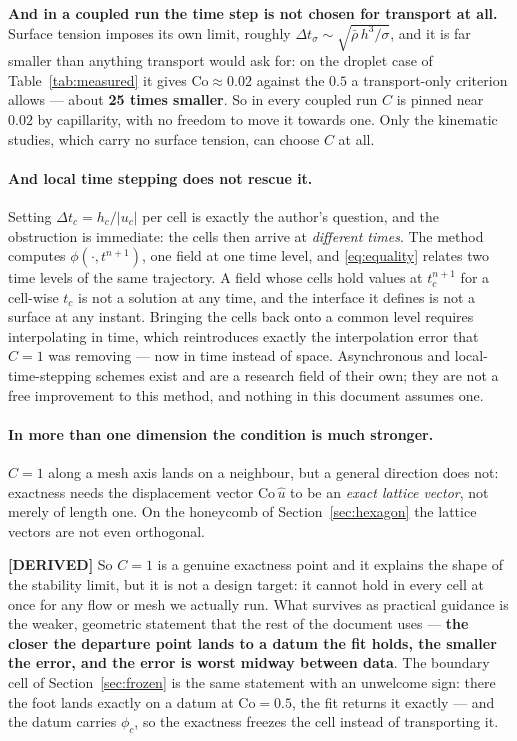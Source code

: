 \documentclass[11pt,a4paper]{article}
\newcommand{\derived}{\textcolor{blue!50!black}{\textbf{[DERIVED]}}}
\begin{document}
\textbf{And in a coupled run the time step is not chosen for transport at all.} Surface tension
imposes its own limit, roughly $\Delta t_\sigma \sim \sqrt{\bar\rho\,h^{3}/\sigma}$, and it is
far smaller than anything transport would ask for: on the droplet case of
Table~\ref{tab:measured} it gives $\mathrm{Co} \approx 0.02$ against the $0.5$ a transport-only
criterion allows --- about \textbf{25 times smaller}. So in every coupled run $C$ is pinned near
$0.02$ by capillarity, with no freedom to move it towards one. Only the kinematic studies, which
carry no surface tension, can choose $C$ at all.

\paragraph{And local time stepping does not rescue it.} Setting
$\Delta t_c = h_c/|u_c|$ per cell is exactly the author's question, and the obstruction is
immediate: the cells then arrive at \emph{different times}. The method computes
$\phi(\cdot,t^{n+1})$, one field at one time level, and \eqref{eq:equality} relates two time
levels of the same trajectory. A field whose cells hold values at $t_c^{n+1}$ for a cell-wise
$t_c$ is not a solution at any time, and the interface it defines is not a surface at any
instant. Bringing the cells back onto a common level requires interpolating in time, which
reintroduces exactly the interpolation error that $C = 1$ was removing --- now in time instead
of space. Asynchronous and local-time-stepping schemes exist and are a research field of their
own; they are not a free improvement to this method, and nothing in this document assumes one.

\paragraph{In more than one dimension the condition is much stronger.} $C = 1$ along a mesh axis
lands on a neighbour, but a general direction does not: exactness needs the displacement vector
$\mathrm{Co}\,\hat u$ to be an \emph{exact lattice vector}, not merely of length one. On the
honeycomb of Section~\ref{sec:hexagon} the lattice vectors are not even orthogonal.

\derived{} So $C = 1$ is a genuine exactness point and it explains the shape of the stability
limit, but it is not a design target: it cannot hold in every cell at once for any flow or mesh
we actually run. What survives as practical guidance is the weaker, geometric statement that the
rest of the document uses --- \textbf{the closer the departure point lands to a datum the fit
holds, the smaller the error, and the error is worst midway between data}. The boundary cell of
Section~\ref{sec:frozen} is the same statement with an unwelcome sign: there the foot lands
exactly on a datum at $\mathrm{Co} = 0.5$, the fit returns it exactly --- and the datum carries
$\phi_c$, so the exactness freezes the cell instead of transporting it.
\end{document}
